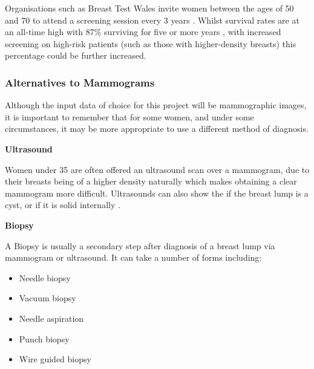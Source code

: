 \vspace{-0.75cm}

Organisations such as Breast Test Wales invite women between the ages of 50 and 70 to attend a screening session every 3 years \cite{Informed_Choice_about_Cancer_Screening_2013}. Whilst survival rates are at an all-time high with 87\% surviving for five or more years \cite{Breast_cancer_statistics_2015}, with increased screening on high-risk patients (such as those with higher-density breasts) this percentage could be further increased.

\vspace{-0.5cm}

\subsubsection{Alternatives to Mammograms}

Although the input data of choice for this project will be \gls{mammographic images}, it is important to remember that for some women, and under some circumstances, it may be more appropriate to use a different method of diagnosis.

\noindent \textbf{Ultrasound}

Women under 35 are often offered an ultrasound scan over a mammogram, due to their breasts being of a higher density naturally which makes obtaining a clear mammogram more difficult. Ultrasounds can also show the if the breast lump is a cyst, or if it is solid internally \cite{Cancer_Research_UK_2015}.

\noindent \textbf{Biopsy}

A Biopsy is usually a secondary step after diagnosis of a breast lump via mammogram or ultrasound. It can take a number of forms including:

\begin{itemize}
\itemsep0em
  \item Needle biopsy
  \item Vacuum biopsy
  \item Needle aspiration
  \item Punch biopsy
  \item Wire guided biopsy
\end{itemize}

